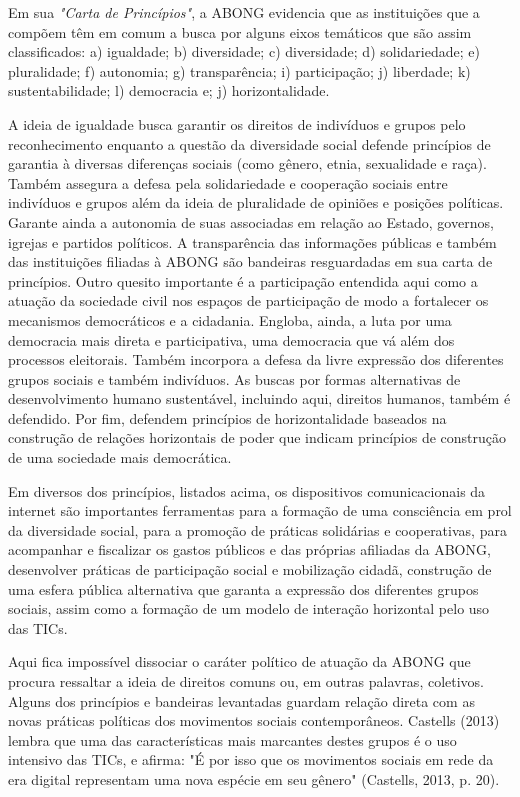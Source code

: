 Em sua \emph{"Carta de Princípios"}, a ABONG evidencia que as
instituições que a compõem têm em comum a busca por alguns eixos
temáticos que são assim classificados: a) igualdade; b) diversidade; c)
diversidade; d) solidariedade; e) pluralidade; f) autonomia; g)
transparência; i) participação; j) liberdade; k) sustentabilidade; l)
democracia e; j) horizontalidade.

A ideia de igualdade busca garantir os direitos de indivíduos e grupos
pelo reconhecimento enquanto a questão da diversidade social defende
princípios de garantia à diversas diferenças sociais (como gênero,
etnia, sexualidade e raça). Também assegura a defesa pela solidariedade
e cooperação sociais entre indivíduos e grupos além da ideia de
pluralidade de opiniões e posições políticas. Garante ainda a autonomia
de suas associadas em relação ao Estado, governos, igrejas e partidos
políticos. A transparência das informações públicas e também das
instituições filiadas à ABONG são bandeiras resguardadas em sua carta de
princípios. Outro quesito importante é a participação entendida aqui
como a atuação da sociedade civil nos espaços de participação de modo a
fortalecer os mecanismos democráticos e a cidadania. Engloba, ainda, a
luta por uma democracia mais direta e participativa, uma democracia que
vá além dos processos eleitorais. Também incorpora a defesa da livre
expressão dos diferentes grupos sociais e também indivíduos. As buscas
por formas alternativas de desenvolvimento humano sustentável, incluindo
aqui, direitos humanos, também é defendido. Por fim, defendem princípios
de horizontalidade baseados na construção de relações horizontais de
poder que indicam princípios de construção de uma sociedade mais
democrática.

Em diversos dos princípios, listados acima, os dispositivos
comunicacionais da internet são importantes ferramentas para a formação
de uma consciência em prol da diversidade social, para a promoção de
práticas solidárias e cooperativas, para acompanhar e fiscalizar os
gastos públicos e das próprias afiliadas da ABONG, desenvolver práticas
de participação social e mobilização cidadã, construção de uma esfera
pública alternativa que garanta a expressão dos diferentes grupos
sociais, assim como a formação de um modelo de interação horizontal pelo
uso das TICs.

Aqui fica impossível dissociar o caráter político de atuação da ABONG
que procura ressaltar a ideia de direitos comuns ou, em outras palavras,
coletivos. Alguns dos princípios e bandeiras levantadas guardam relação
direta com as novas práticas políticas dos movimentos sociais
contemporâneos. Castells (2013) lembra que uma das características mais
marcantes destes grupos é o uso intensivo das TICs, e afirma: "É por
isso que os movimentos sociais em rede da era digital representam uma
nova espécie em seu gênero" (Castells, 2013, p. 20).

